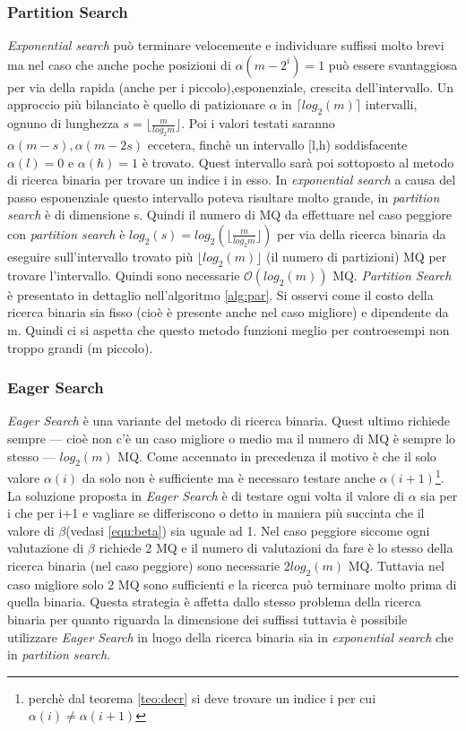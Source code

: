  \subsubsection{Partition Search}
\textit{Exponential search} può terminare velocemente e individuare suffissi molto brevi ma nel caso che  anche poche posizioni di $\alpha(m-2^{i}) = 1$ può essere svantaggiosa per via della rapida (anche per i piccolo),esponenziale, crescita dell'intervallo. Un approccio più bilanciato è quello di patizionare $\alpha$ in $\lceil log_{2}(m)\rceil$ intervalli, ognuno di lunghezza $s = \lfloor  \frac{m}{log_{2}m} \rfloor$. Poi i valori testati saranno $\alpha(m-s), \alpha(m-2s)$ eccetera, finchè un intervallo [l,h) soddisfacente $\alpha(l)=0 \text{ e } \alpha(h)=1$ è trovato. Quest intervallo sarà poi sottoposto al metodo di ricerca binaria per trovare un indice i in esso. In \textit{exponential search} a causa del passo esponenziale questo intervallo poteva risultare molto grande, in \textit{partition search} è di dimensione s. Quindi il numero di \ac{MQ} da effettuare nel caso peggiore con  \textit{partition search} è $log_{2}(s) = log_{2}(\lfloor  \frac{m}{log_{2}m} \rfloor)$ per via della ricerca binaria da eseguire sull'intervallo trovato più $\lfloor log_{2}(m)\rfloor$ (il numero di partizioni) \ac{MQ} per trovare l'intervallo. Quindi sono necessarie $\mathcal{O}(log_{2}(m))$ \ac{MQ}. \textit{Partition Search} è presentato in dettaglio nell'algoritmo \ref{alg:par}. Si osservi come il costo della ricerca binaria sia fisso (cioè è presente anche nel caso migliore) e dipendente da m. Quindi ci si aspetta che questo metodo funzioni meglio per controesempi non troppo grandi (m piccolo).

\subsubsection{Eager Search}
\textit{Eager Search} è una variante del metodo di ricerca binaria. Quest ultimo richiede sempre --- cioè non c'è un caso migliore o medio ma il numero di \ac{MQ} è sempre lo stesso --- $log_{2}(m)$ \ac{MQ}. Come accennato in precedenza il motivo è che il solo valore $\alpha(i)$ da solo non è sufficiente ma è necessaro testare anche $\alpha(i+1)$\footnote{perchè dal teorema \ref{teo:decr} si deve trovare un indice i per cui $\alpha(i) \neq \alpha(i+1)$}. La soluzione proposta in \textit{Eager Search} è di testare ogni volta il valore di $\alpha$ sia per i che per i+1 e vagliare se differiscono o detto in maniera più succinta che il
valore di $\beta$(vedasi \ref{equ:beta}) sia uguale ad 1. Nel caso peggiore siccome ogni valutazione di $\beta$ richiede 2 \ac{MQ} e il numero di valutazioni da fare è lo stesso della ricerca binaria (nel caso peggiore) sono necessarie $2log_{2}(m)$ \ac{MQ}. Tuttavia nel caso migliore solo 2 \ac{MQ} sono sufficienti e la ricerca può terminare molto prima di quella binaria. Questa strategia è affetta dallo stesso problema della ricerca binaria per quanto riguarda la dimensione dei suffissi tuttavia è possibile utilizzare \textit{Eager Search} in luogo della ricerca binaria sia in \textit{exponential search} che in \textit{partition search}. 

